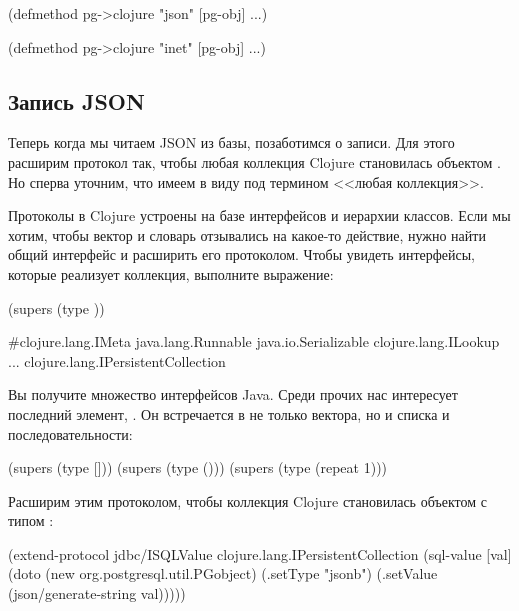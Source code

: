 \begin{english}
  \begin{clojure}
(defmethod pg->clojure "json"
  [pg-obj]
  ...)

(defmethod pg->clojure "inet"
  [pg-obj]
  ...)
  \end{clojure}
\end{english}

\subsection{Запись JSON}

Теперь когда мы читаем JSON из базы, позаботимся о записи. Для этого расширим протокол  так, чтобы любая коллекция Clojure становилась объектом . Но сперва уточним, что имеем в виду под термином <<любая коллекция>>.

Протоколы в Clojure устроены на базе интерфейсов и иерархии классов. Если мы хотим, чтобы вектор и словарь отзывались на какое-то действие, нужно найти общий интерфейс и расширить его протоколом. Чтобы увидеть интерфейсы, которые реализует коллекция, выполните выражение:

\begin{english}
  \begin{clojure}
(supers (type {}))

#{clojure.lang.IMeta
  java.lang.Runnable
  java.io.Serializable
  clojure.lang.ILookup
  ...
  clojure.lang.IPersistentCollection}
  \end{clojure}
\end{english}

Вы получите множество интерфейсов Java. Среди прочих нас интересует последний элемент, . Он встречается в  не только вектора, но и списка и последовательности:

\begin{english}
  \begin{clojure}
(supers (type []))
(supers (type ()))
(supers (type (repeat 1)))
  \end{clojure}
\end{english}

Расширим  этим протоколом, чтобы коллекция Clojure становилась объектом  с типом :

\begin{english}
  \begin{clojure}
(extend-protocol jdbc/ISQLValue
  clojure.lang.IPersistentCollection
  (sql-value [val]
    (doto (new org.postgresql.util.PGobject)
      (.setType "jsonb")
      (.setValue (json/generate-string val)))))
  \end{clojure}
\end{english}

